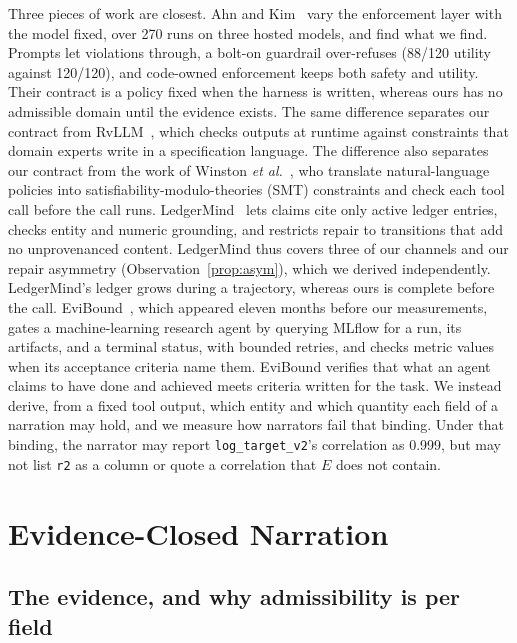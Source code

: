 \documentclass[journal]{IEEEtran}
\begin{document}
Three pieces of work are closest. Ahn and Kim~\cite{ahn2026harness} vary the
enforcement layer with the model fixed, over 270 runs on three hosted models,
and find what we find. Prompts let violations through, a bolt-on guardrail
over-refuses (88/120 utility against 120/120), and code-owned enforcement keeps
both safety and utility. Their contract is a policy fixed when the harness
is written, whereas ours has no admissible domain until the evidence exists.
The same difference separates our contract from RvLLM~\cite{zhang2025rvllm},
which checks outputs at runtime against constraints that domain experts write
in a specification language. The difference also separates our contract from
the work of Winston \emph{et al.}~\cite{winston2026solver}, who translate
natural-language policies into satisfiability-modulo-theories (SMT)
constraints and check each tool call before the call runs. LedgerMind~\cite{du2026ledgermind} lets claims cite only
active ledger entries, checks entity and numeric grounding, and restricts
repair to transitions that add no unprovenanced content. LedgerMind thus
covers three of our channels and our repair asymmetry
(Observation~\ref{prop:asym}), which we derived independently. LedgerMind's
ledger grows during a trajectory, whereas ours is complete before the call.
EviBound~\cite{chen2025evibound}, which appeared eleven months before our
measurements, gates a machine-learning research agent by querying MLflow for a
run, its artifacts, and a terminal status, with bounded retries, and checks
metric values when its acceptance criteria name them. EviBound verifies that
what an agent claims to have done and achieved meets criteria written for the
task. We instead derive, from a fixed tool output, which entity and which
quantity each field of a narration may hold, and we measure how narrators fail
that binding. Under that binding, the narrator may report
\texttt{log\_target\_v2}'s correlation as 0.999, but may not list \texttt{r2}
as a column or quote a correlation that $E$ does not contain.

\section{Evidence-Closed Narration}\label{sec:theory}

\subsection{The evidence, and why admissibility is per field}
\end{document}
